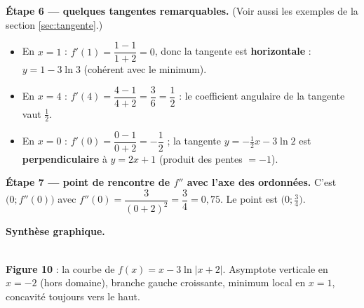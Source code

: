 \documentclass[11pt,a4paper]{article}
\begin{document}
\begin{exemple}[Étude complète de $f(x)=x-3\ln|x+2|$]
\medskip
\textbf{Étape 6 — quelques tangentes remarquables.} (Voir aussi les exemples de la section
\ref{sec:tangente}.)
\begin{itemize}[leftmargin=1.6em,topsep=2pt,itemsep=2pt]
  \item En $x=1$ : $f'(1)=\dfrac{1-1}{1+2}=0$, donc la tangente est \textbf{horizontale} :
        $y=1-3\ln 3$ (cohérent avec le minimum).
  \item En $x=4$ : $f'(4)=\dfrac{4-1}{4+2}=\dfrac{3}{6}=\dfrac{1}{2}$ : le coefficient angulaire de la
        tangente vaut $\tfrac12$.
  \item En $x=0$ : $f'(0)=\dfrac{0-1}{0+2}=-\dfrac12$ ; la tangente $y=-\tfrac12 x-3\ln 2$ est
        \textbf{perpendiculaire} à $y=2x+1$ (produit des pentes $=-1$).
\end{itemize}

\textbf{Étape 7 — point de rencontre de $f''$ avec l'axe des ordonnées.} C'est $\big(0;f''(0)\big)$
avec $f''(0)=\dfrac{3}{(0+2)^2}=\dfrac34=0{,}75$. Le point est $\big(0;\tfrac34\big)$.

\medskip
\textbf{Synthèse graphique.}
\end{exemple}

\begin{center}
\\[2pt]
{\small\textbf{\textcolor{primary}{Figure 10}} : la courbe de $f(x)=x-3\ln|x+2|$. Asymptote verticale
en $x=-2$ (hors domaine), branche gauche croissante, minimum local en $x=1$, concavité toujours vers
le haut.}
\end{center}
\end{document}
